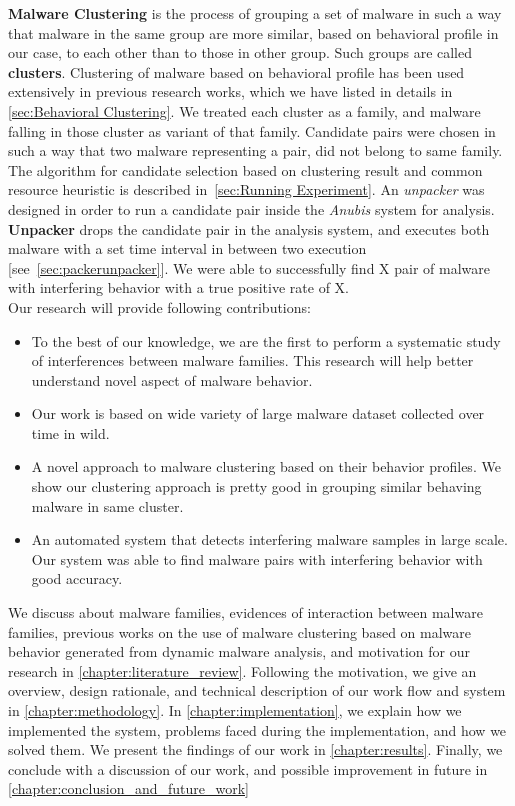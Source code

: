 \textbf{Malware Clustering} is the process of grouping a set of malware in such a way that malware in the same group are more similar, based on behavioral profile in our case, to each other than to those in other group.
Such groups are called \textbf{clusters}.
Clustering of malware based on behavioral profile has been used extensively in previous research works, which we have listed in details in \autoref{sec:Behavioral Clustering}.
We treated each cluster as a family, and malware falling in those cluster as variant of that family.
Candidate pairs were chosen in such a way that two malware representing a pair, did not belong to same family.
The algorithm for candidate selection based on clustering result and common resource heuristic is described in~\autoref{sec:Running Experiment}.
An \emph{unpacker} was designed in order to run a candidate pair inside the \emph{Anubis} system for analysis.
\textbf{Unpacker} drops the candidate pair in the analysis system, and executes both malware with a set time interval in between two execution [see~\autoref{sec:packerunpacker}].
We were able to successfully find X pair of malware with interfering behavior with a true positive rate of X.\\

Our research will provide following contributions:
\begin{itemize}
  \item To the best of our knowledge, we are the first to perform a systematic study of interferences between malware families.
    This research will help better understand novel aspect of malware behavior.
  \item Our work is based on wide variety of large malware dataset collected over time in wild.
  \item A novel approach to malware clustering based on their behavior profiles.
    We show our clustering approach is pretty good in grouping similar behaving malware in same cluster.
  \item An automated system that detects interfering malware samples in large scale.
  Our system was able to find malware pairs with interfering behavior with good accuracy.
\end{itemize}
We discuss about malware families, evidences of interaction between malware families, previous works on the use of malware clustering based on malware behavior generated from dynamic malware analysis, and motivation for our research in \autoref{chapter:literature_review}.
Following the motivation, we give an overview, design rationale, and technical description of our work flow and system in \autoref{chapter:methodology}.
In \autoref{chapter:implementation}, we explain how we implemented the system, problems faced during the implementation, and how we solved them.
We present the findings of our work in \autoref{chapter:results}.
Finally, we conclude with a discussion of our work, and possible improvement in future in \autoref{chapter:conclusion_and_future_work}
